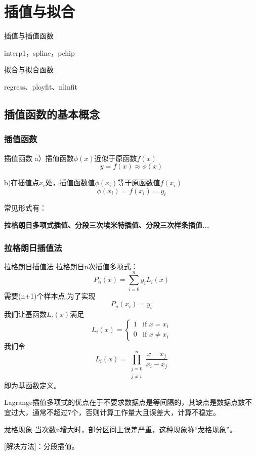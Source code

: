 \chapter{插值与拟合}
\begin{introduction}
\item 插值与插值函数
\item interp1，spline，pchip
\item 拟合与拟合函数
\item regress、ployfit、nlinfit
\end{introduction}
\section{插值函数的基本概念}
\subsection{插值函数}
\begin{definition}{插值函数}{}
a）插值函数$\phi(x)$近似于原函数$f(x)$
\[
y=f(x)\approx\phi(x)
\]

b)在插值点$x_i$处，插值函数值$\phi(x_i)$等于原函数值$f(x_i)$
\[
\phi(x_i)=f(x_i)=y_i
\]
\end{definition}

常见形式有：

\textbf{拉格朗日多项式插值、分段三次埃米特插值、分段三次样条插值...}
\subsection{拉格朗日插值法}
\begin{definition}{拉格朗日插值法}{}
拉格朗日n次插值多项式：
\[
P_n(x)=\sum_{i=0}^{n}{y_iL_i(x)}
\]
需要(n+1)个样本点,为了实现
\[P_n(x_i)=y_i\]
我们让基函数$L_i(x)$满足
\[L_i(x)=
\begin{cases}
1 & \text{if } x=x_i\\
0 & \text{if } x\neq x_i
\end{cases} \]
我们令
\[
L_i(x)=\prod_{\substack{j=0\\j\neq i}}^{n}\frac{x-x_j}{x_i-x_j}
\]
即为基函数定义。
\end{definition}

Lagrange插值多项式的优点在于不要求数据点是等间隔的，其缺点是数据点数不宜过大，通常不超过7个，否则计算工作量大且误差大，计算不稳定。

\begin{definition}{龙格现象}{}
当次数n增大时，部分区间上误差严重，这种现象称“龙格现象”。

[解决方法]：分段插值。
\end{definition}

